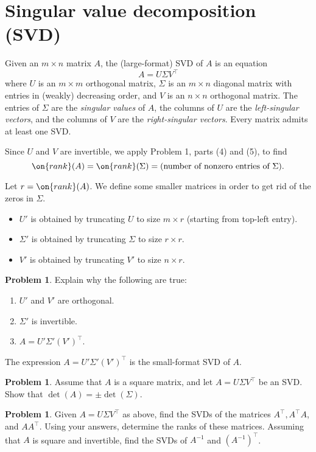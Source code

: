 \documentclass[10pt]{amsart}
\theoremstyle{mythm}
\theoremstyle{definition}
\newtheorem{prob}[thm]{Problem}
\theoremstyle{myrmk}
\begin{document}
	\section{Singular value decomposition (SVD)} 
	
	Given an $m \times n$ matrix $A$, the (large-format) SVD of $A$ is an equation 
	\[
		A = U\Sigma V^\top
	\] 
	where $U$ is an $m \times m$ orthogonal matrix, $\Sigma$ is an $m \times n$ diagonal matrix with entries in (weakly) decreasing order, and $V$ is an $n \times n$ orthogonal matrix. The entries of $\Sigma$ are the \emph{singular values} of $A$, the columns of $U$ are the \emph{left-singular vectors}, and the columns of $V$ are the \emph{right-singular vectors}. Every matrix admits at least one SVD. 
	
	Since $U$ and $V$ are invertible, we apply Problem 1, parts (4) and (5), to find 
	\[
		\on{rank}(A) = \on{rank}(\Sigma) = (\text{number of nonzero entries of $\Sigma$}).
	\]
	
	Let $r = \on{rank}(A)$. We define some smaller matrices in order to get rid of the zeros in $\Sigma$. 
	\begin{itemize}
		\item $U'$ is obtained by truncating $U$ to size $m \times r$ (starting from top-left entry). 
		\item $\Sigma'$ is obtained by truncating $\Sigma$ to size $r \times r$. 
		\item $V'$ is obtained by truncating $V'$ to size $n \times r$. 
	\end{itemize}
	\begin{prob}
		Explain why the following are true: 
		\begin{enumerate}
			\item $U'$ and $V'$ are orthogonal. 
			\item $\Sigma'$ is invertible. 
			\item $A = U'\Sigma' (V')^\top$. 
		\end{enumerate}
	\end{prob}
	The expression $A = U' \Sigma' (V')^{\top}$ is the small-format SVD of $A$. 
	
	\begin{prob}
		Assume that $A$ is a square matrix, and let $A = U \Sigma V^\top$ be an SVD. Show that $\det(A) = \pm \det(\Sigma)$. 
	\end{prob}
	
	\begin{prob}
		Given $A = U \Sigma V^\top$ as above, find the SVDs of the matrices $A^\top, A^\top A$, and $AA^\top$. Using your answers, determine the ranks of these matrices. Assuming that $A$ is square and invertible, find the SVDs of $A^{-1}$ and $(A^{-1})^\top$. 
	\end{prob}
	
\end{document}
